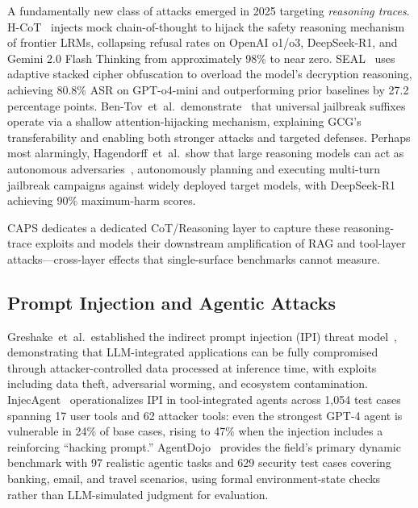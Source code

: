 A fundamentally new class of attacks emerged in 2025 targeting
\emph{reasoning traces}.  H-CoT~\cite{kuo2025hcot} injects mock
chain-of-thought to hijack the safety reasoning mechanism of frontier LRMs,
collapsing refusal rates on OpenAI o1/o3, DeepSeek-R1, and Gemini 2.0 Flash
Thinking from approximately 98\% to near zero. SEAL~\cite{nguyen2025seal}
uses adaptive stacked cipher obfuscation to overload the model's decryption
reasoning, achieving 80.8\% ASR on GPT-o4-mini and outperforming prior
baselines by 27.2 percentage points. Ben-Tov~et~al.\
demonstrate~\cite{bentov2025jailbreakattention} that universal jailbreak
suffixes operate via a shallow attention-hijacking mechanism, explaining
GCG's transferability and enabling both stronger attacks and targeted
defenses. Perhaps most alarmingly, Hagendorff~et~al.\ show that large
reasoning models can act as autonomous adversaries~\cite{hagendorff2026lrms},
autonomously planning and executing multi-turn jailbreak campaigns against
widely deployed target models, with DeepSeek-R1 achieving 90\% maximum-harm
scores.

CAPS dedicates a dedicated CoT/Reasoning layer to capture these
reasoning-trace exploits and models their downstream amplification of RAG and
tool-layer attacks---cross-layer effects that single-surface benchmarks cannot
measure.


\subsection{Prompt Injection and Agentic Attacks}

Greshake~et~al.\ established the indirect prompt injection (IPI) threat
model~\cite{greshake2023indirect}, demonstrating that LLM-integrated
applications can be fully compromised through attacker-controlled data
processed at inference time, with exploits including data theft, adversarial
worming, and ecosystem contamination.
InjecAgent~\cite{zhan2024injecagent} operationalizes IPI in tool-integrated
agents across 1,054 test cases spanning 17 user tools and 62 attacker tools:
even the strongest GPT-4 agent is vulnerable in 24\% of base cases, rising to
47\% when the injection includes a reinforcing ``hacking prompt.''
AgentDojo~\cite{debenedetti2024agentdojo} provides the field's primary dynamic
benchmark with 97 realistic agentic tasks and 629 security test cases covering
banking, email, and travel scenarios, using formal environment-state checks
rather than LLM-simulated judgment for evaluation.

